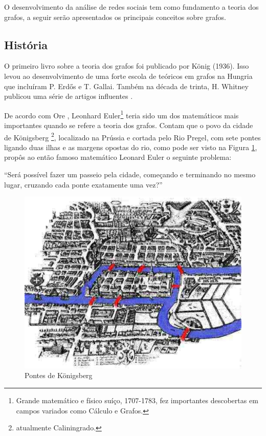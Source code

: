 O desenvolvimento da análise de redes sociais tem como fundamento a teoria dos grafos, a seguir serão apresentados os principais conceitos sobre grafos.

\subsection{História}

O primeiro livro sobre a teoria dos grafos foi publicado por König (1936). Isso levou ao desenvolvimento de uma forte escola de teóricos em grafos na Hungria que incluíram P. Erdős e T. Gallai. Também na década de trinta, H. Whitney publicou uma série de artigos influentes \cite{Bondy:2007}.

De acordo com Ore \cite{Ore:1963}, Leonhard Euler\footnote{Grande matemático e físico suíço, 1707-1783, fez importantes descobertas em campos variados como Cálculo e Grafos.} teria sido um dos matemáticos mais importantes quando se refere a teoria dos grafos. Contam que o povo da cidade de Königsberg \footnote{atualmente Caliningrado.}, localizado na Prússia e cortada pelo Rio Pregel, com sete pontes ligando duas ilhas e as margens opostas do rio, como pode ser visto na Figura \ref{Konigsberg}, propôs ao então famoso matemático Leonard Euler o seguinte problema:

	“Será possível fazer um passeio pela cidade, começando e
	terminando no mesmo lugar, cruzando cada ponte exatamente uma vez?”

\begin{figure}[!h]
	\centering
	\includegraphics[scale=0.5]{figuras/capitulo2/Konigsberg.eps}
	\caption{Pontes de Königsberg}
	\label{Konigsberg}
\end{figure}

